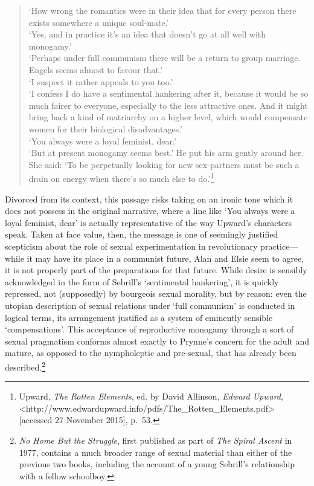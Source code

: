 \documentclass[]{article}
\begin{document}
\begin{quote}
\singlespacing ‘How wrong the romantics were in their idea that for
every person there exists somewhere a unique soul-mate.’\\
‘Yes, and in practice it’s an idea that doesn’t go at all well with
monogamy.’\\
‘Perhaps under full communism there will be a return to group marriage.
Engels seems almost to favour that.’\\
‘I suspect it rather appeals to you too.’\\
‘I confess I do have a sentimental hankering after it, because it would
be so much fairer to everyone, especially to the less attractive ones.
And it might bring back a kind of matriarchy on a higher level, which
would compensate women for their biological disadvantages.’\\
‘You always were a loyal feminist, dear.’\\
‘But at present monogamy seems best.’ He put his arm gently around her.
She said: ‘To be perpetually looking for new sex-partners must be such a
drain on energy when there’s so much else to do.’\footnote{Upward,
  \emph{The Rotten Elements}, ed. by David Allinson, \emph{Edward
  Upward},
  \textless{}http://www.edwardupward.info\slash pdfs\slash The\_Rotten\_Elements.pdf\textgreater{}
  {[}accessed 27 November 2015{]}, p.~53.}
\end{quote}

\noindent Divorced from its context, this passage risks taking on an
ironic tone which it does not possess in the original narrative, where a
line like ‘You always were a loyal feminist, dear’ is actually
representative of the way Upward’s characters speak. Taken at face
value, then, the message is one of seemingly justified scepticism about
the role of sexual experimentation in revolutionary practice—while it
may have its place in a communist future, Alan and Elsie seem to agree,
it is not properly part of the preparations for that future. While
desire is sensibly acknowledged in the form of Sebrill’s ‘sentimental
hankering’, it is quickly repressed, not (supposedly) by bourgeois
sexual morality, but by reason: even the utopian description of sexual
relations under ‘full communism’ is conducted in logical terms, its
arrangement justified as a system of eminently sensible ‘compensations’.
This acceptance of reproductive monogamy through a sort of sexual
pragmatism conforms almost exactly to Prynne’s concern for the adult and
mature, as opposed to the nympholeptic and pre-sexual, that has already
been described.\footnote{\emph{No Home But the Struggle}, first
  published as part of \emph{The Spiral Ascent} in 1977, contains a much
  broader range of sexual material than either of the previous two
  books, including the account of a young Sebrill’s relationship with a
  fellow schoolboy.}
\end{document}

